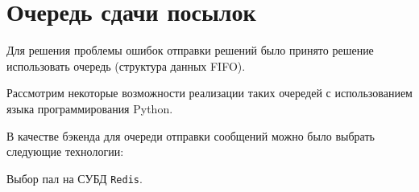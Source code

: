 \section{Очередь сдачи посылок}

Для решения проблемы ошибок отправки решений было принято решение использовать очередь (структура данных FIFO).

Рассмотрим некоторые возможности реализации таких очередей с использованием языка программирования Python.

В качестве бэкенда для очереди отправки сообщений можно было выбрать следующие технологии:

Выбор пал на СУБД \texttt{Redis}.